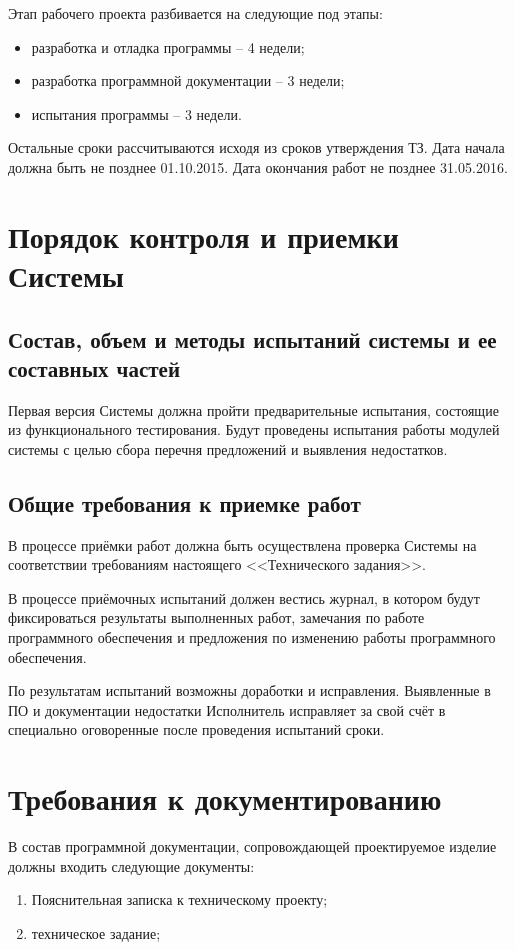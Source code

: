 Этап рабочего проекта разбивается на следующие под этапы:
\begin{itemize}
    \item разработка и отладка программы -- 4 недели;
    \item разработка программной документации -- 3 недели;
    \item испытания программы -- 3 недели.
\end{itemize}

Остальные сроки рассчитываются исходя из сроков утверждения ТЗ. Дата начала должна быть не позднее 
01.10.2015. Дата окончания работ не позднее 31.05.2016.

\chapter{Порядок контроля и приемки Системы}
\label{sec:acceptance}
\section{Состав, объем и методы испытаний системы и ее составных частей}
Первая версия Системы должна пройти предварительные испытания, состоящие из функционального тестирования. 
Будут проведены испытания работы модулей системы с целью сбора перечня предложений и выявления недостатков. 

\section{Общие требования к приемке работ}
В процессе приёмки работ должна быть осуществлена проверка Системы на соответствии требованиям настоящего 
<<Технического задания>>.

В процессе приёмочных испытаний должен вестись журнал, в котором будут фиксироваться результаты выполненных 
работ, замечания по работе программного обеспечения и предложения по изменению работы программного 
обеспечения.

По результатам испытаний возможны доработки и исправления. Выявленные в ПО и документации недостатки 
Исполнитель исправляет за свой счёт в специально оговоренные после проведения испытаний сроки.

\chapter{Требования к документированию}
\label{sec:document}
В состав программной документации, сопровождающей проектируемое изделие должны входить следующие документы:
\begin{enumerate}
    \item Пояснительная записка к техническому проекту;
    \item техническое задание;
\end{enumerate}

\setlength\parindent{15mm}
\stopcontents[sections]